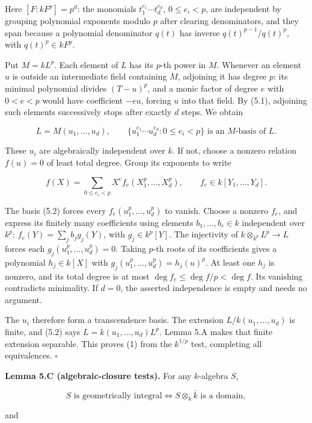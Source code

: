 \documentclass[
]{article}
\begin{document}
Here \([F:kF^p]=p^d\): the monomials \(t_1^{e_1}\cdots t_d^{e_d}\),
\(0\le e_i<p\), are independent by grouping polynomial exponents modulo
\(p\) after clearing denominators, and they span because a polynomial
denominator \(q(t)\) has inverse \(q(t)^{p-1}/q(t)^p\), with
\(q(t)^p\in kF^p\).

Put \(M=kL^p\). Each element of \(L\) has its \(p\)-th power in \(M\).
Whenever an element \(u\) is outside an intermediate field containing
\(M\), adjoining it has degree \(p\): its minimal polynomial divides
\((T-u)^p\), and a monic factor of degree \(e\) with \(0<e<p\) would
have coefficient \(-eu\), forcing \(u\) into that field. By (5.1),
adjoining such elements successively stops after exactly \(d\) steps. We
obtain

\[
L=M(u_1,\ldots,u_d),
\qquad
\{u_1^{e_1}\cdots u_d^{e_d}:0\le e_i<p\}
\text{ is an }M\text{-basis of }L.
\tag{5.2}
\]

These \(u_i\) are algebraically independent over \(k\). If not, choose a
nonzero relation \(f(u)=0\) of least total degree. Group its exponents
to write

\[
f(X)=\sum_{0\le e_i<p}X^e f_e(X_1^p,\ldots,X_d^p),\qquad f_e\in k[Y_1,\ldots,Y_d].
\]

The basis (5.2) forces every \(f_e(u_1^p,\ldots,u_d^p)\) to vanish.
Choose a nonzero \(f_e\), and express its finitely many coefficients
using elements \(b_1,\ldots,b_r\in k\) independent over \(k^p\):
\(f_e(Y)=\sum_j b_jg_j(Y)\), with \(g_j\in k^p[Y]\). The injectivity of
\(k\otimes_{k^p}L^p\to L\) forces each \(g_j(u_1^p,\ldots,u_d^p)=0\).
Taking \(p\)-th roots of its coefficients gives a polynomial
\(h_j\in k[X]\) with \(g_j(u_1^p,\ldots,u_d^p)=h_j(u)^p\). At least one
\(h_j\) is nonzero, and its total degree is at most
\(\deg f_e\le\deg f/p<\deg f\). Its vanishing contradicts minimality. If
\(d=0\), the asserted independence is empty and needs no argument.

The \(u_i\) therefore form a transcendence basis. The extension
\(L/k(u_1,\ldots,u_d)\) is finite, and (5.2) says
\(L=k(u_1,\ldots,u_d)L^p\). Lemma 5.A makes that finite extension
separable. This proves (1) from the \(k^{1/p}\) test, completing all
equivalences. \(\square\)

\textbf{Lemma 5.C (algebraic-closure tests).} For any \(k\)-algebra
\(S\),

\[
S\text{ is geometrically integral}
\Longleftrightarrow S\otimes_k\bar k\text{ is a domain},
\]

and
\end{document}
